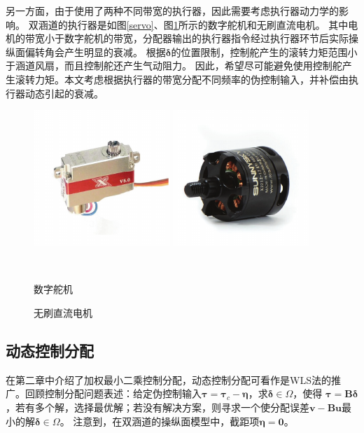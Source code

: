 另一方面，由于使用了两种不同带宽的执行器，因此需要考虑执行器动力学的影响。 双涵道的执行器是如图\ref{servo}、图\ref{motor}所示的数字舵机和无刷直流电机。 其中电机的带宽小于数字舵机的带宽，分配器输出的执行器指令经过执行器环节后实际操纵面偏转角会产生明显的衰减\cite{Harkegaard_2004}。 根据$ \bm{\delta} $的位置限制，控制舵产生的滚转力矩范围小于涵道风扇，而且控制舵还产生气动阻力\cite{Speck_2013a}。 因此，希望尽可能避免使用控制舵产生滚转力矩。本文考虑根据执行器的带宽分配不同频率的伪控制输入，并补偿由执行器动态引起的衰减。
\begin{figure}[htbp]
	\centering
	\begin{minipage}[c]{0.5\textwidth}
		\centering
		\includegraphics[scale=1.3]{Fig/servo.pdf}
	\end{minipage}%
	\begin{minipage}[c]{0.5\textwidth}
		\centering
		\includegraphics[scale=1.3]{Fig/motor.pdf}
	\end{minipage}\\[1pt]
	\begin{minipage}[t]{.5\textwidth}
		\caption{\label{servo}数字舵机}
	\end{minipage}%
	\begin{minipage}[t]{.5\textwidth}
		\caption{\label{motor}无刷直流电机}
	\end{minipage}%
\end{figure}
\subsection{动态控制分配}
在第二章中介绍了加权最小二乘控制分配，动态控制分配可看作是WLS法的推广。回顾控制分配问题表述：给定伪控制输入$\bm{\tau}={{\bm{\tau}}_{ {c}}}-\bm{\eta }$，求$\bm{\delta} \in \Omega$，使得 $\bm{\tau}=\bm{B}\bm{\delta}$，若有多个解，选择最优解；若没有解决方案，则寻求一个使分配误差$\bm{v }-\bm{B}\bm{u}$最小的解$\bm{\delta} \in \Omega$。 注意到，在双涵道的操纵面模型中，截距项$ \bm{\eta }=\bm{0} $。

